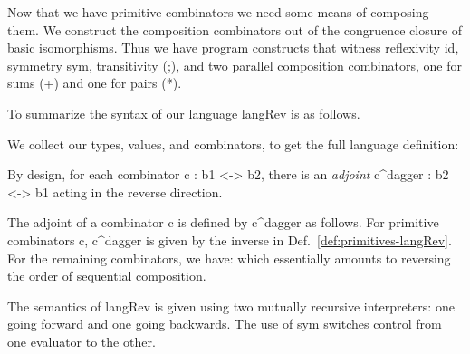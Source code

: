 \documentclass{llncs}
\begin{document}
Now that we have primitive combinators we need some means of composing
them. We construct the composition combinators out of the congruence
closure of basic isomorphisms. Thus we have program constructs that
witness reflexivity {{id}}, symmetry {{sym}}, transitivity {{(;)}},
and two parallel composition combinators, one for sums {{(+)}} and one
for pairs {{(*)}}.

\begin{definition}
%
%
%
\end{definition}

\noindent To summarize the syntax of our language {{langRev}} is as follows.

\begin{definition}
\label{def:langRev}
We collect our types, values, and combinators, to get the full language
definition:
%
\end{definition}

By design, for each combinator {{c : b1 <-> b2}}, there is an
\emph{adjoint} {{c^dagger : b2 <-> b1}} acting in the reverse direction. 

\begin{definition}
 The adjoint of a combinator {{c}} is defined by {{c^dagger}} as
 follows. For primitive combinators {{c}}, {{c^dagger}} is given by
 the inverse in Def.~\ref{def:primitives-langRev}. For the remaining
 combinators, we have:
which essentially amounts to reversing the order of sequential composition.
\end{definition}

The semantics of {{langRev}} is given using two mutually recursive
interpreters: one going forward and one going backwards. The use of
{{sym}} switches control from one evaluator to the other. 
\end{document}
